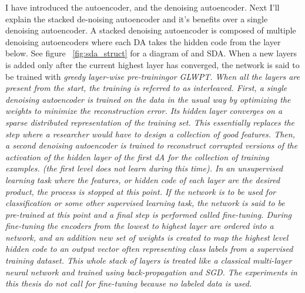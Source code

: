 \documentclass[12pt]{article}
\begin{document}
\begin{doublespacing}
I have introduced the autoencoder, and the denoising autoencoder. Next I'll explain the stacked de-noising autoencoder and it's benefits over a single denoising autoencoder. A stacked denoising autoencoder is composed of multiple denoising autoencoders where each DA takes the hidden code from the layer below. See figure ~\ref{fig:sda_struct} for a diagram of and SDA. When a new layers is added only after the current highest layer has converged, the network is said to be trained with \em greedy layer-wise pre-training\em or GLWPT. When all the layers are present from the start, the training is referred to as interleaved. First, a single denoising autoencoder is trained on the data in the usual way by optimizing the weights to minimize the reconstruction error. Its hidden layer converges on a sparse distributed representation of the training set. This essentially replaces the step where a researcher would have to design a collection of good features. Then, a second denoising autoencoder is trained to reconstruct corrupted versions of the activation of the hidden layer of the first dA for the collection of training examples. (the first level does not learn during this time). In an unsupervised learning task where the features, or hidden code of each layer are the desired product, the process is stopped at this point. If the network is to be used for classification or some other supervised learning task, the network is said to be pre-trained at this point and a final step is performed called fine-tuning. During fine-tuning the encoders from the lowest to highest layer are ordered into a network, and an addition new set of weights is created to map the highest level hidden code to an output vector often representing class labels from a supervised training dataset. This whole stack of layers is treated like a classical multi-layer neural network and trained using back-propagation and SGD. The experiments in this thesis do not call for fine-tuning because no labeled data is used.



\end{doublespacing}
\end{document}
